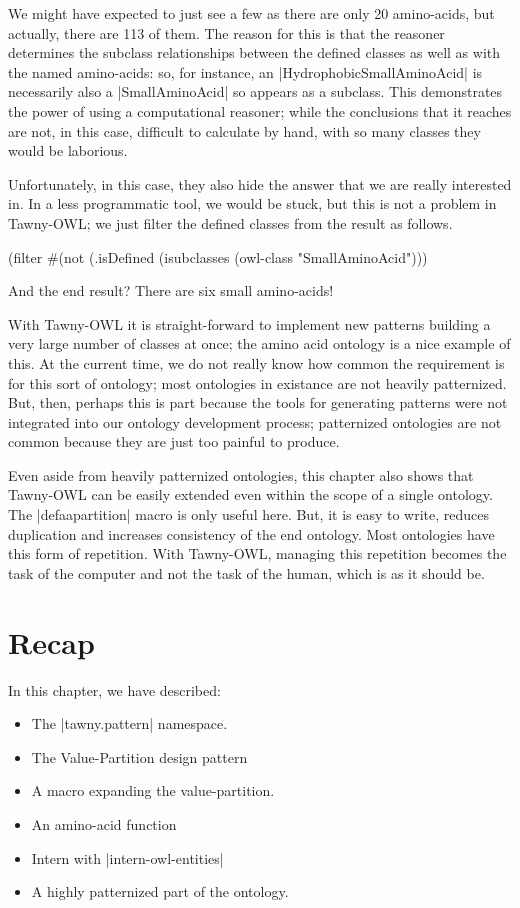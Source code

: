 We might have expected to just see a few as there are only 20 amino-acids, but
actually, there are 113 of them. The reason for this is that the reasoner
determines the subclass relationships between the defined classes as well as
with the named amino-acids: so, for instance, an |HydrophobicSmallAminoAcid|
is necessarily also a |SmallAminoAcid| so appears as a subclass. This
demonstrates the power of using a computational reasoner; while the
conclusions that it reaches are not, in this case, difficult to calculate by
hand, with so many classes they would be laborious.

Unfortunately, in this case, they also hide the answer that we are really
interested in. In a less programmatic tool, we would be stuck, but this is not
a problem in Tawny-OWL; we just filter the defined classes from the result as
follows.

\begin{tawny}
(filter
 #(not (.isDefined %
 (isubclasses
  (owl-class "SmallAminoAcid")))
\end{tawny}

And the end result? There are six small amino-acids!

With Tawny-OWL it is straight-forward to implement new patterns building a
very large number of classes at once; the amino acid ontology is a nice
example of this. At the current time, we do not really know how common the
requirement is for this sort of ontology; most ontologies in existance are not
heavily patternized. But, then, perhaps this is part because the tools for
generating patterns were not integrated into our ontology development process;
patternized ontologies are not common because they are just too painful to
produce.

Even aside from heavily patternized ontologies, this chapter also shows that
Tawny-OWL can be easily extended even within the scope of a single ontology.
The |defaapartition| macro is only useful here. But, it is easy to write,
reduces duplication and increases consistency of the end ontology. Most
ontologies have this form of repetition. With Tawny-OWL, managing this
repetition becomes the task of the computer and not the task of the human,
which is as it should be.

\section{Recap}
\label{sec:recap-2}

In this chapter, we have described:

\begin{itemize}
\item The |tawny.pattern| namespace.
\item The Value-Partition design pattern
\item A macro expanding the value-partition.
\item An amino-acid function
\item Intern with |intern-owl-entities|
\item A highly patternized part of the ontology.
\end{itemize}
